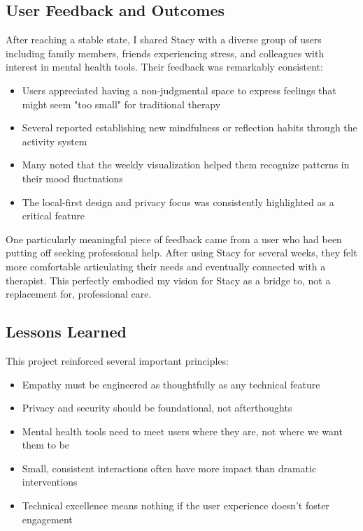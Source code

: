 \documentclass[12pt]{article}
\begin{document}
\subsection{User Feedback and Outcomes}

After reaching a stable state, I shared Stacy with a diverse group of users including family members, friends experiencing stress, and colleagues with interest in mental health tools. Their feedback was remarkably consistent:

\begin{itemize}
    \item Users appreciated having a non-judgmental space to express feelings that might seem "too small" for traditional therapy
    \item Several reported establishing new mindfulness or reflection habits through the activity system
    \item Many noted that the weekly visualization helped them recognize patterns in their mood fluctuations
    \item The local-first design and privacy focus was consistently highlighted as a critical feature
\end{itemize}

One particularly meaningful piece of feedback came from a user who had been putting off seeking professional help. After using Stacy for several weeks, they felt more comfortable articulating their needs and eventually connected with a therapist. This perfectly embodied my vision for Stacy as a bridge to, not a replacement for, professional care.

\subsection{Lessons Learned}

This project reinforced several important principles:

\begin{itemize}
    \item Empathy must be engineered as thoughtfully as any technical feature
    \item Privacy and security should be foundational, not afterthoughts
    \item Mental health tools need to meet users where they are, not where we want them to be
    \item Small, consistent interactions often have more impact than dramatic interventions
    \item Technical excellence means nothing if the user experience doesn't foster engagement
\end{itemize}
\end{document}
